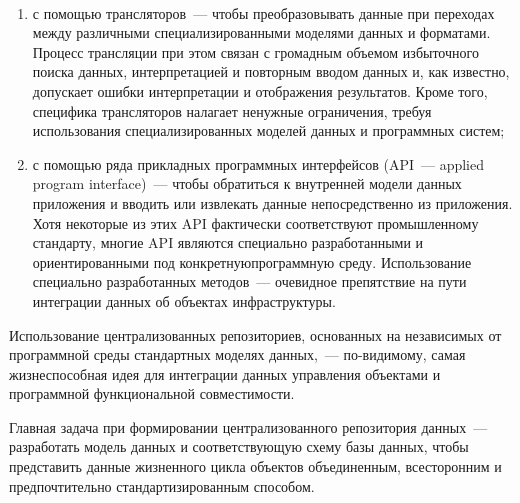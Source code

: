 \begin{figure}[b] %
 \vspace*{1pt}
 \begin{center}
 \mbox{%
 \epsfxsize=149.712mm
 }
 \end{center}
 \vspace*{-9pt}
\end{figure}



\begin{multicols}{2}


 

\noindent
\begin{enumerate}[(1)]
\item с помощью трансляторов~--- чтобы преобразовывать 
данные при переходах между различными специализированными моделями данных и 
форматами. Процесс трансляции при этом связан с громадным объемом избыточного 
поиска данных, интерпретацией и повторным вводом данных и, как известно, допускает 
ошибки интерпретации и отображения результатов. Кроме того, специфика трансляторов 
налагает ненужные ограничения, требуя использования специализированных моделей 
данных и программных систем;
\item с помощью ряда прикладных программных 
интерфейсов (API~--- applied program interface)~--- чтобы обратиться к внутренней модели данных приложения и 
вводить или извлекать данные непосредственно из приложения.\linebreak
 Хотя некоторые из этих 
API фактически соответствуют промышленному стандарту, многие API являются 
специально разработанными и ориентированными под конкретную\linebreak программную среду. 
Использование специально разработанных методов~--- очевидное препятствие на пути 
интеграции данных об объектах инфраструктуры.
\end{enumerate}

 Использование централизованных 
репозиториев, основанных на независимых от программной среды стандартных моделях 
данных,~--- по-ви\-ди\-мо\-му, самая жизнеспособная идея для интеграции данных управления 
объектами и программной функциональной совместимости.


      Главная задача при формировании централизованного репозитория данных~--- 
разработать\linebreak
 модель данных и соответствующую схему базы данных, чтобы представить 
данные жизненного цик\-ла объектов объединенным, всесторонним и пред\-почтитель\-но 
стандартизированным способом. 


\end{multicols}
